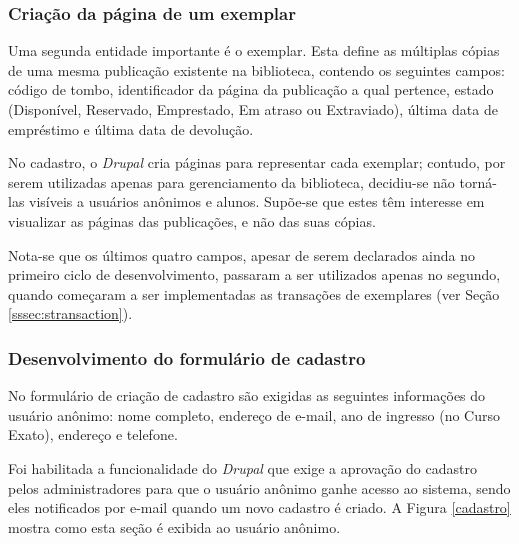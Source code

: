 \documentclass[a4paper]{article}
\begin{document}
\subsubsection{Criação da página de um exemplar}

Uma segunda entidade importante é o exemplar. Esta define as múltiplas cópias de uma mesma publicação existente na biblioteca, contendo os seguintes campos: código de tombo, identificador da página da publicação a qual pertence, estado (Disponível, Reservado, Emprestado, Em atraso ou Extraviado), última data de empréstimo e última data de devolução.

No cadastro, o \textit{Drupal} cria páginas para representar cada exemplar; contudo, por serem utilizadas apenas para gerenciamento da biblioteca, decidiu-se não torná-las visíveis a usuários anônimos e alunos. Supõe-se que estes têm interesse em visualizar as páginas das publicações, e não das suas cópias.

Nota-se que os últimos quatro campos, apesar de serem declarados ainda no primeiro ciclo de desenvolvimento, passaram a ser utilizados apenas no segundo, quando começaram a ser implementadas as transações de exemplares (ver Seção \ref{sssec:stransaction}).

\subsubsection{Desenvolvimento do formulário de cadastro}

No formulário de criação de cadastro são exigidas as seguintes informações do usuário anônimo: nome completo, endereço de e-mail, ano de ingresso (no Curso Exato), endereço e telefone.

Foi habilitada a funcionalidade do \textit{Drupal} que exige a aprovação do cadastro pelos administradores para que o usuário anônimo ganhe acesso ao sistema, sendo eles notificados por e-mail quando um novo cadastro é criado. A Figura \ref{cadastro} mostra como esta seção é exibida ao usuário anônimo.
\end{document}
